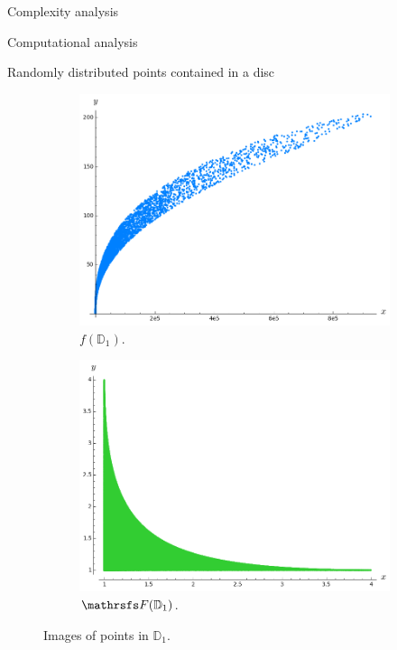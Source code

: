 \documentclass[11pt, a4paper, english, twoside, notitlepage, openright]{report}
\begin{document}
\begin{chapter}{Complexity analysis}
\begin{section}{Computational analysis}
\begin{subsection}{Randomly distributed points contained in a disc}
\begin{figure}[ht!]
\hspace{0.1cm}
\begin{subfigure}{.49\linewidth}\centering
\includegraphics[width=1\textwidth]{plots/ch5_37_disc2.png}
\vspace{-0.4cm}\caption{$f({\mathbb D}_1)$.\label{fig:disc2}}
\end{subfigure}
\begin{subfigure}{.49\linewidth}\centering
\includegraphics[width=1\textwidth]{plots/ch5_39_disc3.png}
\vspace{-0.4cm}\caption{$\FFF({\mathbb D}_1)$.\label{fig:disc3}}
\end{subfigure}
\vspace{-0.1cm}\caption{Images of points in ${\mathbb D}_{1}$.\label{fig:discAll}}
\end{figure}


\end{subsection}
\end{section}
\end{chapter}
\end{document}
